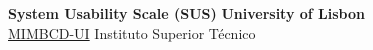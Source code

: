 \documentclass[12pt,twoside,a4paper]{article}
\begin{document}
\noindent
\large
\textbf{System Usability Scale (SUS)} \hfill \textbf{University of Lisbon} \\
\normalsize
\hyperlink{project_link}{MIMBCD-UI} \hfill Instituto Superior T\'{e}cnico \\



\clearpage


\end{document}
